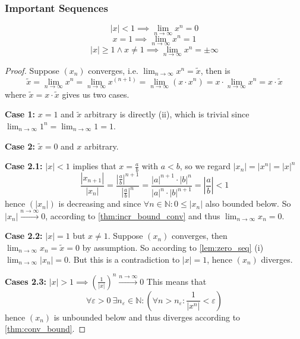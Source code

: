 \subsubsection{Important Sequences}
\begin{proposition}[Sequence \(x^n\)]
      \[|x| < 1 \implies \lim_{n \to \infty} x^n = 0\]
      \[x = 1 \implies \lim_{n \to \infty} x^n = 1\]
      \[|x| \geq 1 \land x \neq 1 \implies \lim_{n \to \infty} x^n = \pm\infty\]
\end{proposition}
\begin{proof}
   Suppose \((x_n)\) converges, i.e. \(\lim_{n \to \infty} x^n = \tilde{x}\), then is
   \[\tilde{x} = \lim_{n \to \infty} x^n = \lim_{n \to \infty} x^{(n+1)} = \lim_{n \to \infty} (x \cdot x^n) = x \cdot \lim_{n \to \infty} x^n = x \cdot \tilde{x}\]
   where \(\tilde{x} = x \cdot \tilde{x}\) gives us two cases.

   \textbf{Case 1:} \(x = 1\) and \(\tilde{x}\) arbitrary is directly (ii), which is trivial since \(\lim_{n \to \infty} 1^n = \lim_{n \to \infty} 1 = 1\).

   \textbf{Case 2:} \(\tilde{x} = 0\) and \(x\) arbitrary.

   \textbf{Case 2.1:} \(|x| < 1\) implies that \(x = \frac{a}{b}\) with \(a < b\), so we regard \(|x_n| = |x^n| = |x|^n\)
   \[\frac{|x_{n+1}|}{|x_n|} = \frac{\left|\frac{a}{b}\right|^{n+1}}{\left|\frac{a}{b}\right|^n} = \frac{|a|^{n+1}\cdot|b|^n}{|a|^n\cdot|b|^{n+1}} = \left|\frac{a}{b}\right| < 1\]
   hence \((|x_n|)\) is decreasing and since \(\forall n \in \mathbb{N}: 0 \leq |x_n|\) also bounded below.
   So \(|x_n| \xrightarrow{n \to \infty} 0\), according to \cref{thm:incr_bound_conv} and thus \(\lim_{n \to \infty} x_n = 0\).

   \textbf{Case 2.2:} \(|x| = 1\) but \(x \neq 1\).
   Suppose \((x_n)\) converges, then \(\lim_{n \to \infty} x_n = \tilde{x} = 0\) by assumption.
   So according to \cref{lem:zero_seq} (i) \(\lim_{n \to \infty} |x_n| = 0\).
   But this is a contradiction to \(|x| = 1\), hence \((x_n)\) diverges.

   \textbf{Cases 2.3:} \(|x| > 1 \implies \left(\frac{1}{|x|}\right)^n \xrightarrow{n \to \infty} 0\)
   This means that
   \[\forall \varepsilon > 0~\exists n_\varepsilon \in \mathbb{N}: \left(\forall n > n_\varepsilon: \frac{1}{|x^n|} < \varepsilon\right)\]
   hence \((x_n)\) is unbounded below and thus diverges according to \cref{thm:conv_bound}.
\end{proof}

